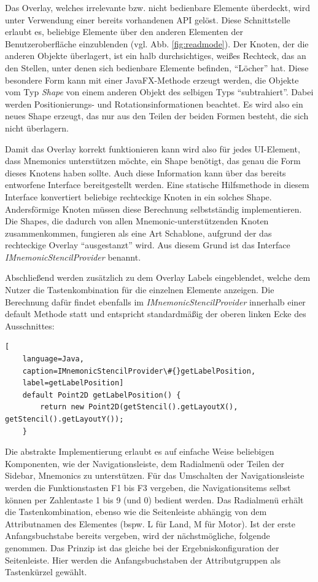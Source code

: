 Das Overlay, welches irrelevante bzw. nicht bedienbare Elemente überdeckt, wird unter Verwendung einer bereits vorhandenen API gelöst. Diese Schnittstelle erlaubt es, beliebige Elemente über den anderen Elementen der Benutzeroberfläche einzublenden (vgl. Abb. \ref{fig:readmode}). Der Knoten, der die anderen Objekte überlagert, ist ein halb durchsichtiges, weißes Rechteck, das an den Stellen, unter denen sich bedienbare Elemente befinden, \enquote{Löcher} hat. Diese besondere Form kann mit einer JavaFX-Methode erzeugt werden, die Objekte vom Typ \textit{Shape} von einem anderen Objekt des selbigen Typs \enquote{subtrahiert}. Dabei werden Positionierungs- und Rotationsinformationen beachtet. Es wird also ein neues Shape erzeugt, das nur aus den Teilen der beiden Formen besteht, die sich nicht überlagern.\par
Damit das Overlay korrekt funktionieren kann wird also für jedes UI-Element, dass Mnemonics unterstützen möchte, ein Shape benötigt, das genau die Form dieses Knotens haben sollte. Auch diese Information kann über das bereits entworfene Interface bereitgestellt werden. Eine statische Hilfsmethode in diesem Interface konvertiert beliebige rechteckige Knoten in ein solches Shape. Andersförmige Knoten müssen diese Berechnung selbstständig implementieren. Die Shapes, die dadurch von allen Mnemonic-unterstützenden Knoten zusammenkommen, fungieren als eine Art Schablone, aufgrund der das rechteckige Overlay \enquote{ausgestanzt} wird. Aus diesem Grund ist das Interface \textit{IMnemonicStencilProvider} benannt.\par
Abschließend werden zusätzlich zu dem Overlay Labels eingeblendet, welche dem Nutzer die Tastenkombination für die einzelnen Elemente anzeigen. Die Berechnung dafür findet ebenfalls im \textit{IMnemonicStencilProvider} innerhalb einer default Methode statt und entspricht standardmäßig der oberen linken Ecke des Ausschnittes:\par
{}
\begin{lstlisting}[
    language=Java,
    caption=IMnemonicStencilProvider\#{}getLabelPosition,
    label=getLabelPosition]
    default Point2D getLabelPosition() {
        return new Point2D(getStencil().getLayoutX(), getStencil().getLayoutY());
    }
\end{lstlisting}
\par
Die abstrakte Implementierung erlaubt es auf einfache Weise beliebigen Komponenten, wie der Navigationsleiste, dem Radialmenü oder Teilen der Sidebar, Mnemonics zu unterstützen. Für das Umschalten der Navigationsleiste werden die Funktionstasten F1 bis F3 vergeben, die Navigationsitems selbst können per Zahlentaste 1 bis 9 (und 0) bedient werden. Das Radialmenü erhält die Tastenkombination, ebenso wie die Seitenleiste abhängig von dem Attributnamen des Elementes (bspw. L für Land, M für Motor). Ist der erste Anfangsbuchstabe bereits vergeben, wird der nächstmögliche, folgende genommen. Das Prinzip ist das gleiche bei der Ergebniskonfiguration der Seitenleiste. Hier werden die Anfangsbuchstaben der Attributgruppen als Tastenkürzel gewählt.\par
